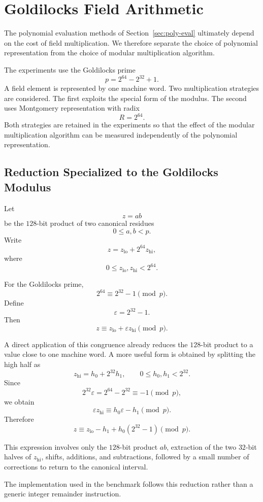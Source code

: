 \section{Goldilocks Field Arithmetic}
\label{sec:goldilocks}

The polynomial evaluation methods of Section~\ref{sec:poly-eval} ultimately
depend on the cost of field multiplication.  We therefore separate the
choice of polynomial representation from the choice of modular
multiplication algorithm.

The experiments use the Goldilocks prime
\[
p=2^{64}-2^{32}+1.
\]
A field element is represented by one machine word.  Two multiplication
strategies are considered.  The first exploits the special form of the
modulus.  The second uses Montgomery representation with radix
\[
R=2^{64}.
\]
Both strategies are retained in the experiments so that the effect of the
modular multiplication algorithm can be measured independently of the
polynomial representation.

\subsection{Reduction Specialized to the Goldilocks Modulus}
\label{sec:goldilocks-special}

Let
\[
z=ab
\]
be the \(128\)-bit product of two canonical residues
\[
0\le a,b<p.
\]
Write
\[
z=z_{\mathrm{lo}}+2^{64}z_{\mathrm{hi}},
\]
where
\[
0\le z_{\mathrm{lo}},z_{\mathrm{hi}}<2^{64}.
\]

For the Goldilocks prime,
\[
2^{64}\equiv 2^{32}-1\pmod p.
\]
Define
\[
\varepsilon=2^{32}-1.
\]
Then
\[
z
\equiv
z_{\mathrm{lo}}+\varepsilon z_{\mathrm{hi}}
\pmod p.
\]

A direct application of this congruence already reduces the \(128\)-bit
product to a value close to one machine word.  A more useful form is
obtained by splitting the high half as
\[
z_{\mathrm{hi}}
=
h_0+2^{32}h_1,
\qquad
0\le h_0,h_1<2^{32}.
\]
Since
\[
2^{32}\varepsilon
=
2^{64}-2^{32}
\equiv -1
\pmod p,
\]
we obtain
\[
\varepsilon z_{\mathrm{hi}}
\equiv
h_0\varepsilon-h_1
\pmod p.
\]
Therefore
\[
z
\equiv
z_{\mathrm{lo}}
-h_1
+h_0(2^{32}-1)
\pmod p.
\]

This expression involves only the \(128\)-bit product \(ab\), extraction of
the two \(32\)-bit halves of \(z_{\mathrm{hi}}\), shifts, additions, and
subtractions, followed by a small number of corrections to return to the
canonical interval.

The implementation used in the benchmark follows this reduction rather than
a generic integer remainder instruction.

